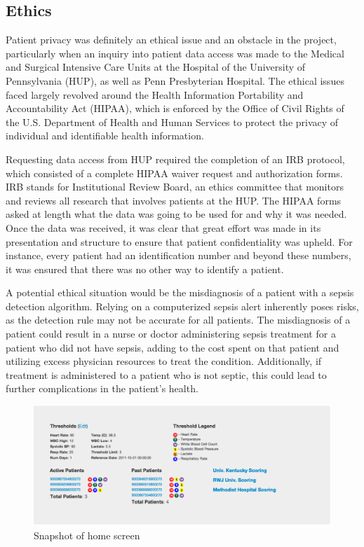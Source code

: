 \documentclass{sig-alternate}
\begin{document}
\vspace{10pt}
\subsection{Ethics}
\label{subsec:ethics}
\vspace{10pt}

Patient privacy was definitely an ethical issue and an obstacle in the project, particularly when an inquiry into patient data access was made to the Medical and Surgical Intensive Care Units at the Hospital of the University of Pennsylvania (HUP), as well as Penn Presbyterian Hospital. The ethical issues faced largely revolved around the Health Information Portability and Accountability Act (HIPAA), which is enforced by the Office of Civil Rights of the U.S. Department of Health and Human Services to protect the privacy of individual and identifiable health information. 

Requesting data access from HUP required the completion of an IRB protocol, which consisted of a complete HIPAA waiver request and authorization forms. IRB stands for Institutional Review Board, an ethics committee that monitors and reviews all research that involves patients at the HUP. The HIPAA forms asked at length what the data was going to be used for and why it was needed. Once the data was received, it was clear that great effort was made in its presentation and structure to ensure that patient confidentiality was upheld. For instance, every patient had an identification number and beyond these numbers, it was ensured that there was no other way to identify a patient. 

A potential ethical situation would be the misdiagnosis of a patient with a sepsis detection algorithm.  Relying on a computerized sepsis alert inherently poses risks, as the detection rule may not be accurate for all patients. The misdiagnosis of a patient could result in a nurse or doctor administering sepsis treatment for a patient who did not have sepsis, adding to the cost spent on that patient and utilizing excess physician resources to treat the condition. Additionally, if treatment is administered to a patient who is not septic, this could lead to further complications in the patient's health.  

\begin{figure}
	\begin{center}
		\includegraphics[width=1.0\linewidth]{home.png}
	\end{center}
	\caption{Snapshot of home screen}
	\label{fig:home}
\end{figure}
\end{document}
